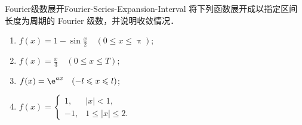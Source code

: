 \begin{problem}{Fourier级数展开}{Fourier-Series-Expansion-Interval}
    将下列函数展开成以指定区间长度为周期的 Fourier 级数，并说明收敛情况．
    \begin{enumerate}
        \item $f(x) = 1 - \sin \frac{x}{2} \quad (0 \leqslant x \leqslant \uppi)$;
        \item $f(x) = \frac{x}{3} \quad (0 \leqslant x \leqslant T)$;
        \item $f(x) = \e^{ax} \quad (-l \leqslant x \leqslant l)$;
        \item $f(x) = \begin{cases} 1, & |x| < 1, \\ -1, & 1 \leqslant |x| \leqslant 2. \end{cases}$
    \end{enumerate}
\end{problem}

